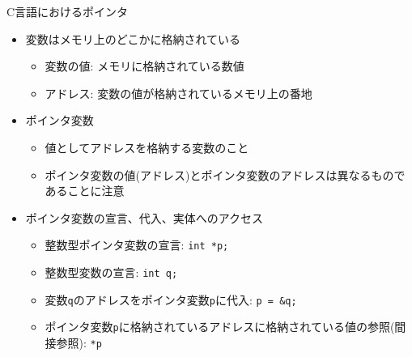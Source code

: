 \begin{frame}[t,fragile]{C言語におけるポインタ}
  \begin{itemize}
    \setlength{\itemsep}{1em}
  \item 変数はメモリ上のどこかに格納されている
    \begin{itemize}
    \item 変数の値: メモリに格納されている数値
    \item アドレス: 変数の値が格納されているメモリ上の番地
    \end{itemize}
  \item ポインタ変数
    \begin{itemize}
    \item 値としてアドレスを格納する変数のこと
    \item ポインタ変数の値(アドレス)とポインタ変数のアドレスは異なるものであることに注意
    \end{itemize}
  \item ポインタ変数の宣言、代入、実体へのアクセス
    \begin{itemize}
    \item 整数型ポインタ変数の宣言: {\color{red} \verb+int *p;+}
    \item 整数型変数の宣言: \verb+int q;+
    \item 変数\verb+q+のアドレスをポインタ変数\verb+p+に代入: {\color{red} \verb+p = &q;+}
    \item ポインタ変数\verb+p+に格納されているアドレスに格納されている値の参照(間接参照): {\color{red} \verb+*p+}
    \end{itemize}
  \end{itemize}
\end{frame}
